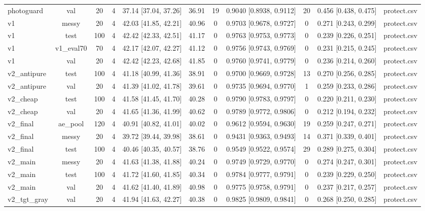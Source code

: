 \begin{table}[t]
{\begin{tabular}{lcccccccccc}
photoguard & val & 20 & 4 & 37.14 [37.04, 37.26] & 36.91 & 19 & 0.9040 [0.8938, 0.9112] & 20 & 0.456 [0.438, 0.475] & protect.csv \\
v1 & messy & 20 & 4 & 42.03 [41.85, 42.21] & 40.96 & 0 & 0.9703 [0.9678, 0.9727] & 0 & 0.271 [0.243, 0.299] & protect.csv \\
v1 & test & 100 & 4 & 42.42 [42.33, 42.51] & 41.17 & 0 & 0.9763 [0.9753, 0.9773] & 0 & 0.239 [0.226, 0.251] & protect.csv \\
v1 & v1\_eval70 & 70 & 4 & 42.17 [42.07, 42.27] & 41.12 & 0 & 0.9756 [0.9743, 0.9769] & 0 & 0.231 [0.215, 0.245] & protect.csv \\
v1 & val & 20 & 4 & 42.42 [42.23, 42.68] & 41.85 & 0 & 0.9760 [0.9741, 0.9779] & 0 & 0.236 [0.214, 0.260] & protect.csv \\
v2\_antipure & test & 100 & 4 & 41.18 [40.99, 41.36] & 38.91 & 0 & 0.9700 [0.9669, 0.9728] & 13 & 0.270 [0.256, 0.285] & protect.csv \\
v2\_antipure & val & 20 & 4 & 41.39 [41.02, 41.78] & 39.61 & 0 & 0.9735 [0.9694, 0.9770] & 1 & 0.259 [0.233, 0.286] & protect.csv \\
v2\_cheap & test & 100 & 4 & 41.58 [41.45, 41.70] & 40.28 & 0 & 0.9790 [0.9783, 0.9797] & 0 & 0.220 [0.211, 0.230] & protect.csv \\
v2\_cheap & val & 20 & 4 & 41.65 [41.36, 41.99] & 40.62 & 0 & 0.9789 [0.9772, 0.9806] & 0 & 0.212 [0.194, 0.232] & protect.csv \\
v2\_final & ae\_pool & 120 & 4 & 40.91 [40.82, 41.01] & 40.02 & 0 & 0.9612 [0.9594, 0.9630] & 19 & 0.259 [0.247, 0.271] & protect.csv \\
v2\_final & messy & 20 & 4 & 39.72 [39.44, 39.98] & 38.61 & 0 & 0.9431 [0.9363, 0.9493] & 14 & 0.371 [0.339, 0.401] & protect.csv \\
v2\_final & test & 100 & 4 & 40.46 [40.35, 40.57] & 38.76 & 0 & 0.9549 [0.9522, 0.9574] & 29 & 0.289 [0.275, 0.304] & protect.csv \\
v2\_main & messy & 20 & 4 & 41.63 [41.38, 41.88] & 40.24 & 0 & 0.9749 [0.9729, 0.9770] & 0 & 0.274 [0.247, 0.301] & protect.csv \\
v2\_main & test & 100 & 4 & 41.72 [41.60, 41.85] & 40.34 & 0 & 0.9784 [0.9777, 0.9791] & 0 & 0.239 [0.229, 0.250] & protect.csv \\
v2\_main & val & 20 & 4 & 41.62 [41.40, 41.89] & 40.98 & 0 & 0.9775 [0.9758, 0.9791] & 0 & 0.237 [0.217, 0.257] & protect.csv \\
v2\_tgt\_gray & val & 20 & 4 & 41.94 [41.63, 42.27] & 40.38 & 0 & 0.9825 [0.9809, 0.9841] & 0 & 0.268 [0.250, 0.285] & protect.csv \\

\end{tabular}}
\end{table}
